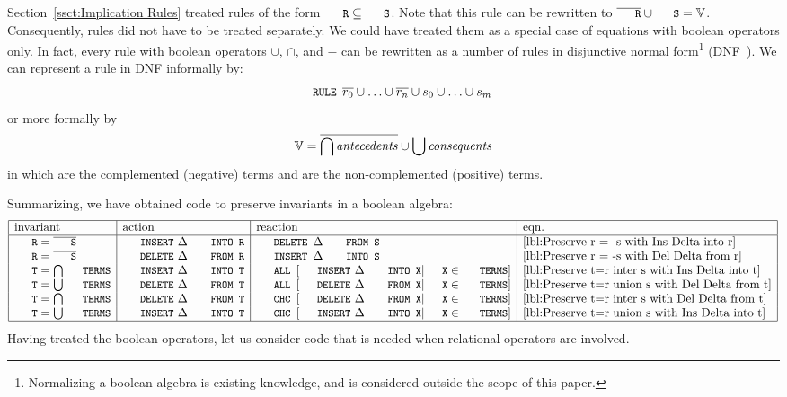 \documentclass{svproc}
\begin{document}
	Section~\ref{ssct:Implication Rules} treated rules of the form $\code{R}\subs\code{S}$.
	Note that this rule can be rewritten to $\cmpl{\code{R}}\cup\code{S}=\full$.
	Consequently, rules did not have to be treated separately.
	We could have treated them as a special case of equations with boolean operators only.
	In fact, every rule with boolean operators $\cup$, $\cap$, and $-$ can be rewritten as a number of rules in disjunctive normal form\footnote{%
	Normalizing a boolean algebra is existing knowledge, and is considered outside the scope of this paper.} (DNF~\cite{davey1990}).
	We can represent a rule in DNF informally by:
\begin{eqnarray}
\code{RULE }\cmpl{r_0}\cup\ldots\cup\cmpl{r_n}\cup s_0\cup\ldots\cup s_m
\end{eqnarray}
	or more formally by
\begin{eqnarray}
\mathbb{V}=\overline{\bigcap\text{\em antecedents\/}}\cup\bigcup\text{\em consequents\/}
\end{eqnarray}
	in which  are the complemented (negative) terms and  are the non-complemented (positive) terms.

	Summarizing, we have obtained code to preserve invariants in a boolean algebra:
\[\begin{array}{|l|l|l|l|}
\hline
\text{invariant}&\text{action}&\text{reaction}&\text{eqn.}\\ \hline
\code{R}=\cmpl{\code{S}}&\code{INSERT}\ \Delta\code{ INTO R}&\code{DELETE }\Delta\code{ FROM S}&\ref{lbl:Preserve r = -s with Ins Delta into r}\\
\code{R}=\cmpl{\code{S}}&\code{DELETE}\ \Delta\code{ FROM R}&\code{INSERT }\Delta\code{ INTO S}&\ref{lbl:Preserve r = -s with Del Delta from r}\\
\code{T}=\bigcap\code{TERMS}&\code{INSERT}\ \Delta\code{ INTO T}&\code{ALL }[\code{INSERT}\ \Delta\code{ INTO X}|\code{X}\in\code{TERMS}]&\ref{lbl:Preserve t=r inter s with Ins Delta into t}\\
\code{T}=\bigcup\code{TERMS}&\code{DELETE}\ \Delta\code{ FROM T}&\code{ALL }[\code{DELETE}\ \Delta\code{ FROM X}|\code{X}\in\code{TERMS}]&\ref{lbl:Preserve t=r union s with Del Delta from t}\\
\code{T}=\bigcap\code{TERMS}&\code{DELETE}\ \Delta\code{ FROM T}&\code{CHC }[\code{DELETE}\ \Delta\code{ FROM X}|\code{X}\in\code{TERMS}]&\ref{lbl:Preserve t=r inter s with Del Delta from t}\\
\code{T}=\bigcup\code{TERMS}&\code{INSERT}\ \Delta\code{ INTO T}&\code{CHC }[\code{INSERT}\ \Delta\code{ INTO X}|\code{X}\in\code{TERMS}]&\ref{lbl:Preserve t=r union s with Ins Delta into t}\\ \hline
\end{array}\]
	Having treated the boolean operators, let us consider code that is needed when relational operators are involved.
\end{document}

